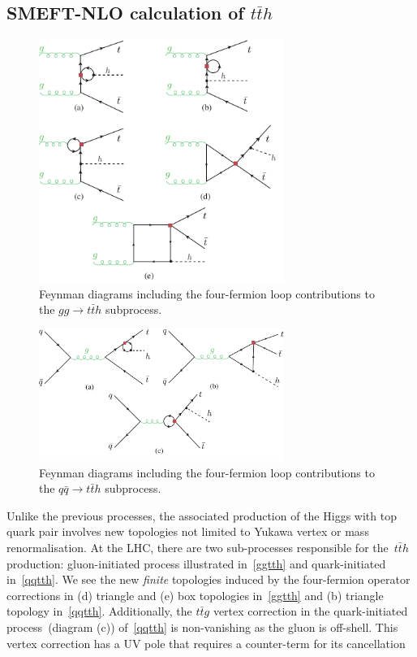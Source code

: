 \subsection{SMEFT-NLO calculation of  $t\bar th$}
\begin{figure}[h!]
	\centering
	\includegraphics[width=8cm]{./fig/ggttH-4F_NLO}
	\caption{Feynman diagrams including the four-fermion loop contributions to the $ gg \to t\bar{t} h$ subprocess.}
	\label{ggtth}
\end{figure}
\begin{figure}[hth]
	\centering
	\includegraphics[width=8cm]{./fig/qqttH-4F_NLO}
	\caption{Feynman diagrams including the four-fermion loop contributions to the  $ q \bar{q} \to t\bar{t} h$ subprocess.}
	\label{qqtth}
\end{figure}
\par Unlike the previous processes, the associated production of the Higgs with top quark pair involves new topologies not limited to Yukawa vertex or mass renormalisation.  At the LHC, there are two sub-processes responsible for the~$t\bar t h$ production: gluon-initiated process illustrated in~\autoref{ggtth} and quark-initiated in~\autoref{qqtth}. We see the new \emph{finite} topologies induced by the four-fermion operator corrections in (d) triangle and (e) box topologies in~\autoref{ggtth} and (b) triangle topology in~\autoref{qqtth}.  Additionally, the $t\bar t g$ vertex correction in the quark-initiated process~(diagram (c)) of~\autoref{qqtth} is non-vanishing as the gluon is off-shell. This vertex correction has a UV pole that requires a counter-term for its cancellation
